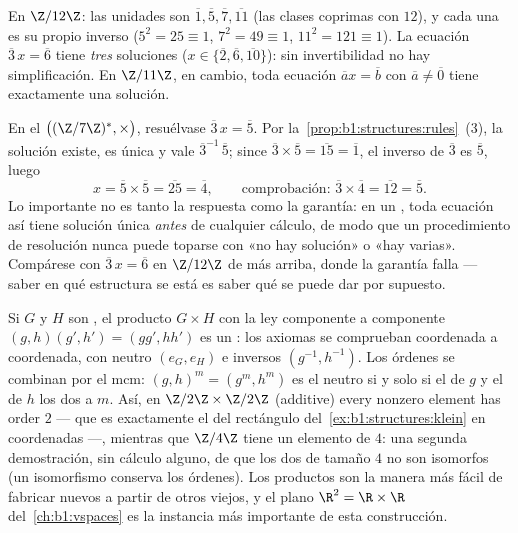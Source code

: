 \begin{example}[Calcular en $\Z/n\Z$]\label{ex:b1:structures:zncomputation}
En $\Z/12\Z$: las unidades son $\overline 1, \overline 5, \overline 7,
\overline{11}$ (las clases coprimas con $12$), y cada una es su
propio inverso ($5^2 = 25 \equiv 1$, $7^2 = 49 \equiv 1$, $11^2 = 121
\equiv 1$). La ecuación $\overline 3\, x = \overline 6$ tiene
\emph{tres} soluciones ($x \in \{\overline 2, \overline 6,
\overline{10}\}$): sin invertibilidad no hay simplificación. En
$\Z/11\Z$, en cambio, toda ecuación $\overline a x = \overline b$ con
$\overline a \neq \overline 0$ tiene exactamente una solución.
\end{example}

\begin{example}\label{ex:b1:structures:solving}
En el  $\bigl((\Z/7\Z)^*, \times\bigr)$, resuélvase $\overline
3\,x = \overline 5$. Por la~\cref{prop:b1:structures:rules}~(3), la
solución existe, es única y vale $\overline3^{-1}\,
\overline5$; since $\overline3 \times \overline5 = \overline{15}
= \overline1$, el inverso de $\overline 3$ es $\overline 5$, luego
\[
x = \overline5 \times \overline5 = \overline{25} = \overline4,
\qquad\text{comprobación: } \overline3 \times \overline4 =
\overline{12} = \overline5 .
\]
Lo importante no es tanto la respuesta como la garantía: en un
, toda ecuación así tiene solución única \emph{antes} de
cualquier cálculo, de modo que un procedimiento de resolución nunca
puede toparse con «no hay solución» o «hay varias». Compárese con
$\overline3\,x = \overline6$ en $\Z/12\Z$ de más arriba, donde la
garantía falla --- saber en qué estructura se está es saber qué se
puede dar por supuesto.
\end{example}

\begin{example}\label{ex:b1:structures:product}
Si $G$ y $H$ son , el  producto $G \times H$ con la ley
componente a componente $(g, h)(g', h') = (gg', hh')$ es un :
los axiomas se comprueban coordenada a coordenada, con neutro
$(e_G, e_H)$ e inversos $(g^{-1}, h^{-1})$. Los órdenes se combinan
por el mcm: $(g, h)^m = (g^m, h^m)$ es el neutro si y solo si el
 de $g$ y el de $h$  los dos a $m$. Así, en $\Z/2\Z
\times \Z/2\Z$ (additive) every nonzero element has order $2$
--- que es exactamente el  del rectángulo
del~\cref{ex:b1:structures:klein} en coordenadas ---, mientras que
$\Z/4\Z$ tiene un elemento de  $4$: una segunda demostración, sin
cálculo alguno, de que los dos  de tamaño $4$ no son isomorfos
(un isomorfismo conserva los órdenes). Los productos son la manera más
fácil de fabricar  nuevos a partir de otros viejos, y el plano
$\R^2 = \R \times \R$ del~\cref{ch:b1:vspaces} es la instancia más
importante de esta construcción.
\end{example}

